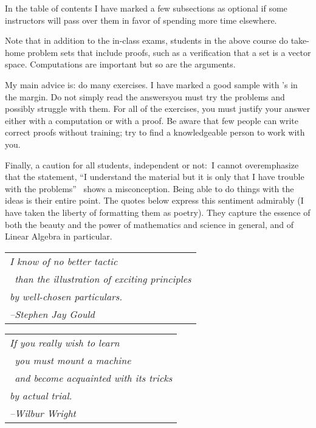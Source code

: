 {In the table of contents
I have marked a few subsections as optional if
some instructors will pass over them in favor of spending more time elsewhere. 

Note that 
in addition to the in-class exams,
students in the above course do 
take-home problem sets that include proofs, such as a verification
that a set is a vector space.
Computations are important but so are the arguments.

My main advice is: do many exercises.
I have marked a good sample with \recommendationmark's in the margin.
Do not simply read the answers\Dash you must
try the problems and possibly struggle with them.
For all of the exercises, you must justify your answer either with a computation
or with a proof.
Be aware that few people can write correct proofs without training;
try to find a knowledgeable person to work with you.

Finally, a caution for all students, independent or not:~I 
cannot overemphasize that the 
statement, ``I understand the material but it is only 
that I have trouble with the problems''\ %
shows a misconception.
Being able to do things with the ideas is their entire point.
The quotes below express this sentiment admirably
(I have taken the liberty of formatting them as poetry).
They capture the essence of both the beauty and the power
of mathematics and science in general, 
and of Linear Algebra in particular.

\medskip
\par\noindent\begin{tabular}[t]{@{}l@{}}
  \textit{I know of no better tactic}                     \\
  \textit{\ than the illustration of exciting principles} \\
  \textit{by well-chosen particulars.}                    \\
  \hspace*{1in}\textit{--Stephen Jay Gould}
\end{tabular}

\medskip
\par\noindent
\begin{tabular}[t]{@{}l@{}}   
\textit{If you really wish to learn}                     \\
   \textit{\ you must mount a machine}  \\ 
   \textit{\ and become acquainted with its tricks} \\
   \textit{by actual trial.}                    \\
   \hspace*{1in}\textit{--Wilbur Wright}
\end{tabular}

}
